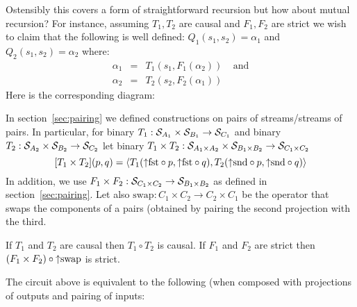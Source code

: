 Ostensibly this covers a form of straightforward recursion but how about mutual recursion? For instance, assuming $T_1,T_2$ are causal and $F_1,F_2$ are strict we wish to claim that the following is well defined: $Q_1(s_1,s_2)=\alpha_1$ and $Q_2(s_1,s_2)=\alpha_2$ where:
\begin{eqnarray*}
\alpha_1 & = & T_1(s_1,F_1(\alpha_2))~~~~~\mbox{and}\\
\alpha_2 & = & T_2(s_2,F_2(\alpha_1))
\end{eqnarray*}
Here is the corresponding diagram:

\begin{center}
\end{center}

In section~\ref{sec:pairing} we defined constructions on pairs of streams/streams of pairs.
In particular, for binary $T_1:\mathcal{S}_{A_1}\times\mathcal{S}_{B_1}\to\mathcal{S}_{C_1}$ and
binary $T_2:\mathcal{S}_{A_2}\times\mathcal{S}_{B_2}\to\mathcal{S}_{C_2}$
let
binary $T_1\times T_2:\mathcal{S}_{A_1\times A_2}\times\mathcal{S}_{B_1\times B_2}\to\mathcal{S}_{C_1\times C_2}$
$$
[T_1\times T_2](p,q) = \langle T_1({\uparrow}\mbox{fst}\circ p,{\uparrow}\mbox{fst}\circ q),T_2({\uparrow}\mbox{snd}\circ p,{\uparrow}\mbox{snd}\circ q) \rangle
$$
In addition, we use $F_1\times F_2:\mathcal{S}_{C_1\times C_2}\to\mathcal{S}_{B_1\times B_2}$ as defined in section~\ref{sec:pairing}. Let also $\mbox{swap}: C_1\times C_2 \to C_2 \times C_1$
be the operator that swaps the components of a pairs (obtained by pairing the second projection
with the third.
\begin{proposition}
If $T_1$ and $T_2$ are causal then $T_1\circ T_2$ is causal. If $F_1$ and $F_2$ are strict then
$(F_1\times F_2)\circ{\uparrow}\mbox{swap}$ is strict.
\end{proposition}
The circuit above is equivalent to the following (when composed with projections of outputs
and pairing of inputs:

